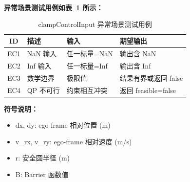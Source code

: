 \documentclass[a4paper,10pt]{article}
\begin{document}
\noindent\textbf{异常场景测试用例如表~\ref{tab:abnormal_clampControlInput} 所示：}
\begin{table}[h]
\centering
\caption{clampControlInput 异常场景测试用例}
\label{tab:abnormal_clampControlInput}
\begin{tabular}{|c|p{3.5cm}|p{3.5cm}|p{3.5cm}|}
\hline
ID & 描述 & 输入 & 期望输出 \\ \hline
  EC1 & NaN 输入 & 任一标量=NaN & 输出含 NaN \\ \hline
  EC2 & Inf 输入 & 任一标量=Inf & 输出含 Inf \\ \hline
  EC3 & 数学边界 & 极限值 & 结果有界或返回 false \\ \hline
  EC4 & QP 不可行 & 约束相互冲突 & 返回 feasible=false \\ \hline
\end{tabular}
\end{table}

\noindent\textbf{符号说明：}
\begin{itemize}
  \item dx, dy: ego-frame 相对位置 (m)
  \item v\_rx, v\_ry: ego-frame 相对速度 (m/s)
  \item r: 安全圆半径 (m)
  \item B: Barrier 函数值
\end{itemize}
\end{document}
